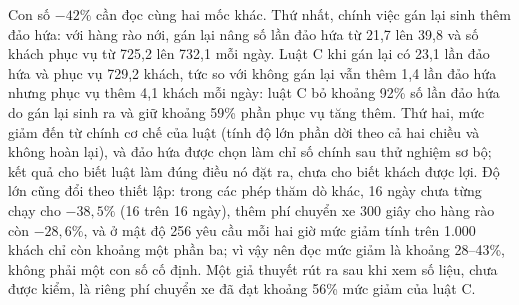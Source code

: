 Con số $-42\%$ cần đọc cùng hai mốc khác. Thứ nhất, chính việc gán lại sinh thêm đảo hứa: với hàng rào nới, gán lại nâng số
lần đảo hứa từ 21,7 lên 39,8 và số khách phục vụ từ 725,2 lên 732,1 mỗi ngày. Luật C khi gán lại có 23,1 lần đảo hứa và
phục vụ 729,2 khách, tức so với không gán lại vẫn thêm 1,4 lần đảo hứa nhưng phục vụ thêm 4,1 khách mỗi ngày: luật C bỏ
khoảng 92\% số lần đảo hứa do gán lại sinh ra và giữ khoảng 59\% phần phục vụ tăng thêm. Thứ hai, mức giảm đến từ chính cơ
chế của luật (tính độ lớn phần dời theo cả hai chiều và không hoàn lại), và đảo hứa được chọn làm chỉ số chính sau thử
nghiệm sơ bộ; kết quả cho biết luật làm đúng điều nó đặt ra, chưa cho biết khách được lợi. Độ lớn cũng đổi theo thiết lập:
trong các phép thăm dò khác, 16 ngày chưa từng chạy cho $-38{,}5\%$ (16 trên 16 ngày), thêm phí chuyển xe 300 giây cho
hàng rào còn $-28{,}6\%$, và ở mật độ 256 yêu cầu mỗi hai giờ mức giảm tính trên 1.000 khách chỉ còn khoảng một phần ba;
vì vậy nên đọc mức giảm là khoảng 28--43\%, không phải một con số cố định. Một giả thuyết rút ra sau khi xem số liệu, chưa
được kiểm, là riêng phí chuyển xe đã đạt khoảng 56\% mức giảm của luật C.

